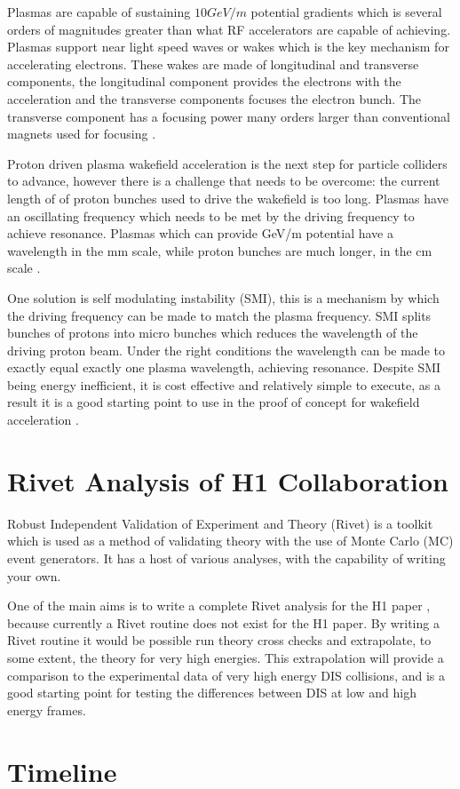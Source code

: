 \documentclass[journal, a4paper,11pt]{IEEEtran}
\begin{document}
Plasmas are capable of sustaining $10 GeV/m$ potential gradients which is several orders of magnitudes greater than what RF accelerators are capable of achieving. Plasmas support near light speed waves or wakes which is the key mechanism for accelerating electrons. These wakes are made of longitudinal and transverse components, the longitudinal component provides the electrons with the acceleration and the transverse components focuses the electron bunch. The transverse component has a focusing power many orders larger than conventional magnets used for focusing \cite{0114}.

Proton driven plasma wakefield acceleration is the next step for particle colliders to advance, however there is a challenge that needs to be overcome: the current length of of proton bunches used to drive the wakefield is too long. Plasmas have an oscillating frequency which needs to be met by the driving frequency to achieve resonance. Plasmas which can provide GeV/m potential have a wavelength in the mm scale, while proton bunches are much longer, in the cm scale \cite{0114}.

One solution is self modulating instability (SMI), this is a mechanism by which the driving frequency can be made to match the plasma frequency. SMI splits bunches of protons into micro bunches which reduces the wavelength of the driving proton beam. Under the right conditions the wavelength can be made to exactly equal exactly one plasma wavelength, achieving resonance. Despite SMI being energy inefficient, it is cost effective and relatively simple to execute, as a result it is a good starting point to use in the proof of concept for wakefield acceleration \cite{1115}.

\section{Rivet Analysis of H1 Collaboration}

Robust Independent Validation of Experiment and Theory (Rivet) is a toolkit which is used as a method of validating theory with the use of Monte Carlo (MC) event generators. It has a host of various analyses, with the capability of writing your own. 

One of the main aims is to write a complete Rivet analysis for the H1 paper \cite{H1}, because currently a Rivet routine does not exist for the H1 paper. By writing a Rivet routine it would be possible run theory cross checks and extrapolate, to some extent, the theory for very high energies. This extrapolation will provide a comparison to the experimental data of very high energy DIS collisions, and is a good starting point for testing the differences between DIS at low and high energy frames.


\section{Timeline}




\end{document}
